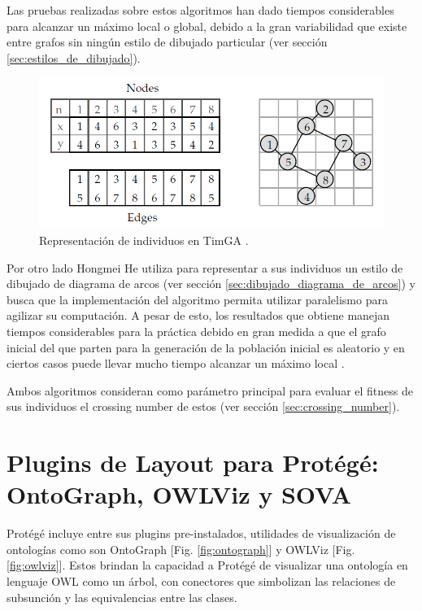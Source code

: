 Las pruebas realizadas sobre estos algoritmos han dado tiempos considerables para alcanzar un máximo local o global, debido a la gran variabilidad que existe entre grafos sin ningún estilo de dibujado particular \cite{gibson2013survey} (ver sección \ref{sec:estilos_de_dibujado}).

\begin{figure}[H]
	\centering
	\includegraphics[width=13cm]{imagenes/timga_representacion.png}
	\caption{Representación de individuos en TimGA \cite{eloranta2001timga}.}
	\label{fig:timga_representacion}
\end{figure}

Por otro lado Hongmei He \cite{he2007parallelisation} utiliza para representar a sus individuos un estilo de dibujado de diagrama de arcos (ver sección \ref{sec:dibujado_diagrama_de_arcos}) y busca que la implementación del algoritmo permita utilizar paralelismo para agilizar su computación. A pesar de esto, los resultados que obtiene manejan tiempos considerables para la práctica debido en gran medida a que el grafo inicial del que parten para la generación de la población inicial es aleatorio y en ciertos casos puede llevar mucho tiempo alcanzar un máximo local \cite{gibson2013survey}.

Ambos algoritmos consideran como parámetro principal para evaluar el fitness de sus individuos el crossing number de estos (ver sección \ref{sec:crossing_number}).

	
\section{Plugins de Layout para Protégé: OntoGraph, OWLViz y SOVA}
Protégé \cite{knublauch2004protege} incluye entre sus plugins pre-instalados, utilidades de visualización de ontologías como son OntoGraph \cite{falconer2010ontograf}[Fig. \ref{fig:ontograph}] y OWLViz \cite{horridge2010owlviz} [Fig. \ref{fig:owlviz}]. Estos brindan la capacidad a Protégé de visualizar una ontología en lenguaje OWL como un árbol, con conectores que simbolizan las relaciones de subsunción y las equivalencias entre las clases.

